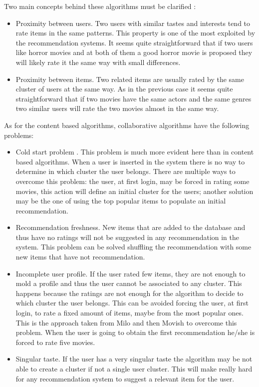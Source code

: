\begin{itemize}
Two main concepts behind these algorithms must be clarified \cite{analysis-recommender-systems}:
\begin{itemize}
\item Proximity between users. Two users with similar tastes and interests tend to rate items in the same patterns. This property is one of the most exploited by the recommendation systems. It seems quite straightforward that if two users like horror movies and at both of them a good horror movie is proposed they will likely rate it the same way with small differences.
\item Proximity between items. Two related items are usually rated by the same cluster of users at the same way. As in the previous case it seems quite straightforward that if two movies have the same actors and the same genres two similar users will rate the two movies almost in the same way.
\end{itemize}
As for the content based algorithms, collaborative algorithms have the following problems:
\begin{itemize}
\item Cold start problem \cite{cold-start-recommendations}. This problem is much more evident here than in content based algorithms. When a user is inserted in the system there is no way to determine in which cluster the user belongs. There are multiple ways to overcome this problem: the user, at first login, may be forced in rating some movies, this action will define an initial cluster for the users; another solution may be the one of using the top popular items to populate an initial recommendation.
\item Recommendation freshness. New items that are added to the database and thus have no ratings will not be suggested in any recommendation in the system. This problem can be solved shuffling the recommendation with some new items that have not recommendation.
\item Incomplete user profile. If the user rated few items, they are not enough to mold a profile and thus the user cannot be associated to any cluster. This happens because the ratings are not enough for the algorithm to decide to which cluster the user belongs. This can be avoided forcing the user, at first login, to rate a fixed amount of items, maybe from the most popular ones. This is the approach taken from Milo and then Movish to overcome this problem. When the user is going to obtain the first recommendation he/she is forced to rate five movies.
\item Singular taste. If the user has a very singular taste the algorithm may be not able to create a cluster if not a single user cluster. This will make really hard for any recommendation system to suggest a relevant item for the user.
\end{itemize}
\end{itemize}

